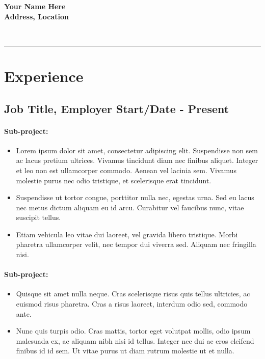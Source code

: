 \documentclass[a4paper]{article}
\newcommand{\divider}{{\noindent\color{light-gray}\rule{\textwidth}{0.4pt}}}
\begin{document}
	\begin{center}
		\textbf{Your Name Here}\\
		\textbf{Address, Location}\\
	\end{center}
	\\

	\divider

	\section*{Experience}
		\subsection*{Job Title, Employer  \hfill Start/Date - Present}
			\paragraph{Sub-project:}
				\begin{itemize}
					\item Lorem ipsum dolor sit amet, consectetur adipiscing elit. Suspendisse non sem ac lacus pretium ultrices. Vivamus tincidunt diam nec finibus aliquet. Integer et leo non est ullamcorper commodo. Aenean vel lacinia sem. Vivamus 							molestie purus nec odio tristique, et scelerisque erat tincidunt.
					
					\item  Suspendisse ut tortor congue, porttitor nulla nec, egestas urna. Sed eu lacus nec metus dictum aliquam eu id arcu. Curabitur vel faucibus nunc, vitae suscipit tellus. 
					
					\item Etiam vehicula leo vitae dui laoreet, vel gravida libero tristique. Morbi pharetra ullamcorper velit, nec tempor dui viverra sed. Aliquam nec fringilla nisi.
				\end{itemize}
			\paragraph{Sub-project:}
				\begin{itemize}
					\item Quisque sit amet nulla neque. Cras scelerisque risus quis tellus ultricies, ac euismod risus pharetra. Cras a risus laoreet, interdum odio sed, commodo ante.
					
					\item Nunc quis turpis odio. Cras mattis, tortor eget volutpat mollis, odio ipsum malesuada ex, ac aliquam nibh nisi id tellus. Integer nec dui ac eros eleifend finibus id id sem. Ut vitae purus ut diam rutrum molestie ut et nulla.
				\end{itemize}
\end{document}
